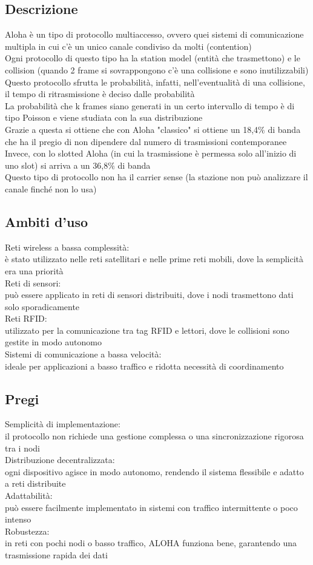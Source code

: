 \documentclass[10pt,oneside,a4paper]{article}
\begin{document}
\subsection{Descrizione}
Aloha è un tipo di protocollo multiaccesso, ovvero quei sistemi di comunicazione multipla in cui c'è un unico canale condiviso da molti (contention)\\
Ogni protocollo di questo tipo ha la station model (entità che trasmettono) e le collision (quando 2 frame si sovrappongono c'è una collisione e sono inutilizzabili)\\
Questo protocollo sfrutta le probabilità, infatti, nell'eventualità di una collisione, il tempo di ritrasmissione è deciso dalle probabilità\\
La probabilità che k frames siano generati in un certo intervallo di tempo è di tipo Poisson e viene studiata con la sua distribuzione\\
Grazie a questa si ottiene che con Aloha "classico" si ottiene un 18,4$\%$ di banda che ha il pregio di non dipendere dal numero di trasmissioni contemporanee\\
Invece, con lo slotted Aloha (in cui la trasmissione è permessa solo all'inizio di uno slot) si arriva a un 36,8$\%$ di banda\\
Questo tipo di protocollo non ha il carrier sense (la stazione non può analizzare il canale finché non lo usa)
\subsection{Ambiti d'uso}
Reti wireless a bassa complessità:\\
è stato utilizzato nelle reti satellitari e nelle prime reti mobili, dove la semplicità era una priorità\\
Reti di sensori:\\
può essere applicato in reti di sensori distribuiti, dove i nodi trasmettono dati solo sporadicamente\\
Reti RFID:\\
utilizzato per la comunicazione tra tag RFID e lettori, dove le collisioni sono gestite in modo autonomo\\
Sistemi di comunicazione a bassa velocità:\\
ideale per applicazioni a basso traffico e ridotta necessità di coordinamento
\subsection{Pregi}
Semplicità di implementazione:\\
il protocollo non richiede una gestione complessa o una sincronizzazione rigorosa tra i nodi\\
Distribuzione decentralizzata:\\
ogni dispositivo agisce in modo autonomo, rendendo il sistema flessibile e adatto a reti distribuite\\
Adattabilità:\\
può essere facilmente implementato in sistemi con traffico intermittente o poco intenso\\
Robustezza:\\
in reti con pochi nodi o basso traffico, ALOHA funziona bene, garantendo una trasmissione rapida dei dati
\end{document}
